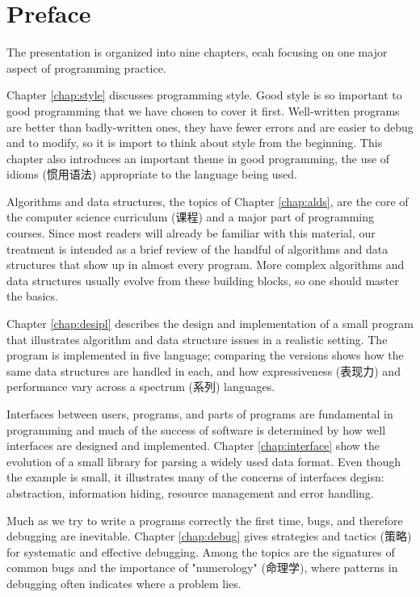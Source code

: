 
\chapter{Preface}
\label{chap:preface}
The presentation is organized into nine chapters, ecah focusing on one
major aspect of programming practice.

Chapter \ref{chap:style} discusses programming style. Good style is so
important to good programming that we have chosen to cover it first.
Well-written programs are better than badly-written ones, they have fewer
errors and are easier to debug and to modify, so it is import to think
about style from the beginning. This chapter also introduces an important
theme in good programming, the use of idioms (惯用语法) appropriate to the
language being used.

Algorithms and data structures, the topics of Chapter \ref{chap:alds}, are
the core of the computer science curriculum (课程) and a major part of
programming courses. Since most readers will already be familiar with this
material, our treatment is intended as a brief review of the handful of
algorithms and data structures that show up in almost every program. More
complex algorithms and data structures usually evolve from these building
blocks, so one should master the basics.

Chapter \ref{chap:desipl} describes the design and implementation of a
small program that illustrates algorithm and data structure issues in a
realistic setting. The program is implemented in five language; comparing
the versions shows how the same data structures are handled in each, and
how expressiveness (表现力) and performance vary across a spectrum (系列)
languages.

Interfaces between users, programs, and parts of programs are fundamental
in programming and much of the success of software is determined by how
well interfaces are designed and implemented. Chapter \ref{chap:interface}
show the evolution of a small library for parsing a widely used data
format. Even though the example is small, it illustrates many of the
concerns of interfaces degisn: abstraction, information hiding, resource
management and error handling.

Much as we try to write a programs correctly the first time, bugs, and
therefore debugging are inevitable. Chapter \ref{chap:debug} gives
strategies and tactics (策略) for systematic and effective debugging. Among
the topics are the signatures of common bugs and the importance of
"numerology" (命理学), where patterns in debugging often indicates where a
problem lies.

